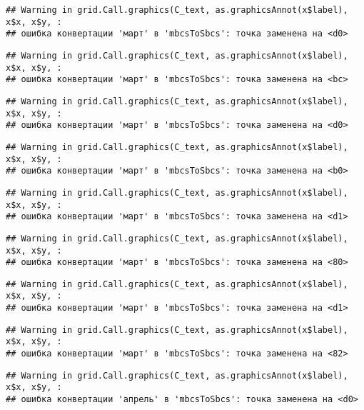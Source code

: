 \documentclass[
]{article}
\begin{document}
\begin{verbatim}
## Warning in grid.Call.graphics(C_text, as.graphicsAnnot(x$label), x$x, x$y, :
## ошибка конвертации 'март' в 'mbcsToSbcs': точка заменена на <d0>
\end{verbatim}

\begin{verbatim}
## Warning in grid.Call.graphics(C_text, as.graphicsAnnot(x$label), x$x, x$y, :
## ошибка конвертации 'март' в 'mbcsToSbcs': точка заменена на <bc>
\end{verbatim}

\begin{verbatim}
## Warning in grid.Call.graphics(C_text, as.graphicsAnnot(x$label), x$x, x$y, :
## ошибка конвертации 'март' в 'mbcsToSbcs': точка заменена на <d0>
\end{verbatim}

\begin{verbatim}
## Warning in grid.Call.graphics(C_text, as.graphicsAnnot(x$label), x$x, x$y, :
## ошибка конвертации 'март' в 'mbcsToSbcs': точка заменена на <b0>
\end{verbatim}

\begin{verbatim}
## Warning in grid.Call.graphics(C_text, as.graphicsAnnot(x$label), x$x, x$y, :
## ошибка конвертации 'март' в 'mbcsToSbcs': точка заменена на <d1>
\end{verbatim}

\begin{verbatim}
## Warning in grid.Call.graphics(C_text, as.graphicsAnnot(x$label), x$x, x$y, :
## ошибка конвертации 'март' в 'mbcsToSbcs': точка заменена на <80>
\end{verbatim}

\begin{verbatim}
## Warning in grid.Call.graphics(C_text, as.graphicsAnnot(x$label), x$x, x$y, :
## ошибка конвертации 'март' в 'mbcsToSbcs': точка заменена на <d1>
\end{verbatim}

\begin{verbatim}
## Warning in grid.Call.graphics(C_text, as.graphicsAnnot(x$label), x$x, x$y, :
## ошибка конвертации 'март' в 'mbcsToSbcs': точка заменена на <82>
\end{verbatim}

\begin{verbatim}
## Warning in grid.Call.graphics(C_text, as.graphicsAnnot(x$label), x$x, x$y, :
## ошибка конвертации 'апрель' в 'mbcsToSbcs': точка заменена на <d0>
\end{verbatim}
\end{document}
